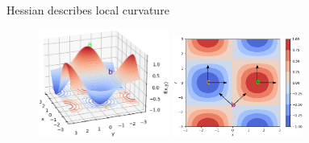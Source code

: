 \begin{vbframe}{Hessian describes local curvature}
\begin{figure}[!tbp]
    \includegraphics[width=0.38\textwidth]{figure_man/hessian_3d.png}
    \hspace{0.5cm}
    \includegraphics[width=0.38\textwidth]{figure_man/hessian_contour.png}
\end{figure} 

\end{vbframe}


